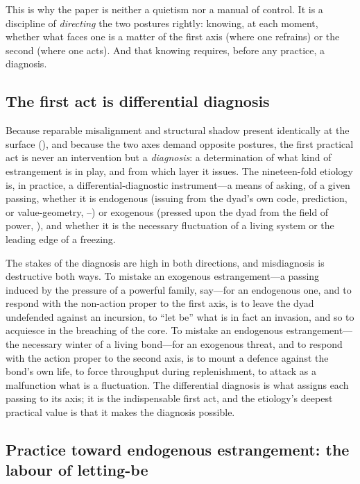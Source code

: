 \noindent
This is why the paper is neither a quietism nor a manual of control. It is a discipline of \emph{directing} the two postures rightly: knowing, at each moment, whether what faces one is a matter of the first axis (where one refrains) or the second (where one acts). And that knowing requires, before any practice, a diagnosis.

\subsection{The first act is differential diagnosis}
\label{p17:sub:praxis-diagnosis}

Because reparable misalignment and structural shadow present identically at the surface (), and because the two axes demand opposite postures, the first practical act is never an intervention but a \emph{diagnosis}: a determination of what kind of estrangement is in play, and from which layer it issues. The nineteen-fold etiology is, in practice, a differential-diagnostic instrument---a means of asking, of a given passing, whether it is endogenous (issuing from the dyad's own code, prediction, or value-geometry, --) or exogenous (pressed upon the dyad from the field of power, ), and whether it is the necessary fluctuation of a living system or the leading edge of a freezing.

The stakes of the diagnosis are high in both directions, and misdiagnosis is destructive both ways. To mistake an exogenous estrangement---a passing induced by the pressure of a powerful family, say---for an endogenous one, and to respond with the non-action proper to the first axis, is to leave the dyad undefended against an incursion, to ``let be'' what is in fact an invasion, and so to acquiesce in the breaching of the core. To mistake an endogenous estrangement---the necessary winter of a living bond---for an exogenous threat, and to respond with the action proper to the second axis, is to mount a defence against the bond's own life, to force throughput during replenishment, to attack as a malfunction what is a fluctuation. The differential diagnosis is what assigns each passing to its axis; it is the indispensable first act, and the etiology's deepest practical value is that it makes the diagnosis possible.

\subsection{Practice toward endogenous estrangement: the labour of letting-be}
\label{p17:sub:praxis-endo}

